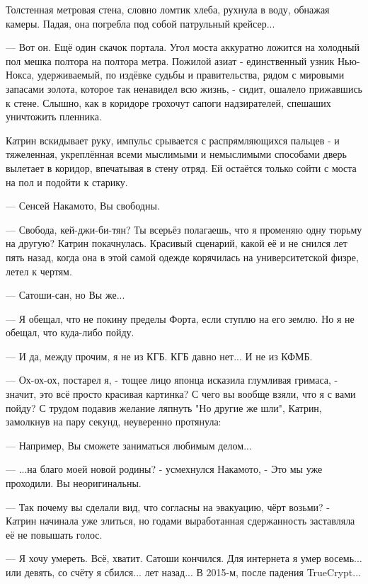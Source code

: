 Толстенная метровая стена, словно ломтик хлеба, рухнула в воду, обнажая камеры. Падая, она погребла под собой патрульный крейсер...


--- Вот он.
Ещё один скачок портала. Угол моста аккуратно ложится на холодный пол мешка полтора на полтора метра. Пожилой азиат - единственный узник Нью-Нокса, удерживаемый, по издёвке судьбы и правительства, рядом с мировыми запасами золота, которое так ненавидел всю жизнь, - сидит, ошалело прижавшись к стене. Слышно, как в коридоре грохочут сапоги надзирателей, спешаших уничтожить пленника.

Катрин вскидывает руку, импульс срывается с распрямляющихся пальцев - и тяжеленная, укреплённая всеми мыслимыми и немыслимыми способами дверь вылетает в коридор, впечатывая в стену отряд. Ей остаётся только сойти с моста на пол и подойти к старику.

--- Сенсей Накамото, Вы свободны.







--- Свобода, кей-джи-би-тян? Ты всерьёз полагаешь, что я променяю одну тюрьму на другую?
Катрин покачнулась. Красивый сценарий, какой её и не снился лет пять назад, когда она в этой самой одежде корячилась на университетской физре, летел к чертям.

--- Сатоши-сан, но Вы же...

--- Я обещал, что не покину пределы Форта, если ступлю на его землю. Но я не обещал, что куда-либо пойду.

--- И да, между прочим, я не из КГБ. КГБ давно нет... И не из КФМБ.

--- Ох-ох-ох, постарел я, - тощее лицо японца исказила глумливая гримаса, - значит, это всё просто красивая картинка? С чего вы вообще взяли, что я с вами пойду?
С трудом подавив желание ляпнуть "Но другие же шли", Катрин, замолкнув на пару секунд, неуверенно протянула:

--- Например, Вы сможете заниматься любимым делом...

--- ...на благо моей новой родины? - усмехнулся Накамото, - Это мы уже проходили. Вы неоригинальны.

--- Так почему вы сделали вид, что согласны на эвакуацию, чёрт возьми? - Катрин начинала уже злиться, но годами выработанная сдержанность заставляла её не повышать голос.

--- Я хочу умереть. Всё, хватит. Сатоши кончился. Для интернета я умер восемь... или девять, со счёту я сбился... лет назад... В 2015-м, после падения TrueCrypt...

